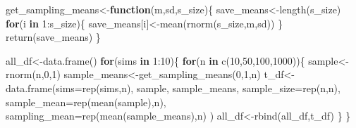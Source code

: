 \documentclass[
  letterpaper,
  DIV=11,
  numbers=noendperiod]{scrreprt}
\newenvironment{Shaded}{\begin{snugshade}}{\end{snugshade}}
\newcommand{\AttributeTok}[1]{\textcolor[rgb]{0.40,0.45,0.13}{#1}}
\newcommand{\ControlFlowTok}[1]{\textcolor[rgb]{0.00,0.23,0.31}{\textbf{#1}}}
\newcommand{\DecValTok}[1]{\textcolor[rgb]{0.68,0.00,0.00}{#1}}
\newcommand{\FunctionTok}[1]{\textcolor[rgb]{0.28,0.35,0.67}{#1}}
\newcommand{\NormalTok}[1]{\textcolor[rgb]{0.00,0.23,0.31}{#1}}
\newcommand{\OtherTok}[1]{\textcolor[rgb]{0.00,0.23,0.31}{#1}}
\newcommand{\SpecialCharTok}[1]{\textcolor[rgb]{0.37,0.37,0.37}{#1}}
\begin{document}
\begin{Shaded}
\begin{Highlighting}[]
\NormalTok{get\_sampling\_means}\OtherTok{\textless{}{-}}\ControlFlowTok{function}\NormalTok{(m,sd,s\_size)\{}
\NormalTok{  save\_means}\OtherTok{\textless{}{-}}\FunctionTok{length}\NormalTok{(s\_size)}
  \ControlFlowTok{for}\NormalTok{(i }\ControlFlowTok{in} \DecValTok{1}\SpecialCharTok{:}\NormalTok{s\_size)\{}
\NormalTok{    save\_means[i]}\OtherTok{\textless{}{-}}\FunctionTok{mean}\NormalTok{(}\FunctionTok{rnorm}\NormalTok{(s\_size,m,sd))}
\NormalTok{  \}}
  \FunctionTok{return}\NormalTok{(save\_means)}
\NormalTok{\}}

\NormalTok{all\_df}\OtherTok{\textless{}{-}}\FunctionTok{data.frame}\NormalTok{()}
\ControlFlowTok{for}\NormalTok{(sims }\ControlFlowTok{in} \DecValTok{1}\SpecialCharTok{:}\DecValTok{10}\NormalTok{)\{}
  \ControlFlowTok{for}\NormalTok{(n }\ControlFlowTok{in} \FunctionTok{c}\NormalTok{(}\DecValTok{10}\NormalTok{,}\DecValTok{50}\NormalTok{,}\DecValTok{100}\NormalTok{,}\DecValTok{1000}\NormalTok{))\{}
\NormalTok{    sample}\OtherTok{\textless{}{-}}\FunctionTok{rnorm}\NormalTok{(n,}\DecValTok{0}\NormalTok{,}\DecValTok{1}\NormalTok{)}
\NormalTok{    sample\_means}\OtherTok{\textless{}{-}}\FunctionTok{get\_sampling\_means}\NormalTok{(}\DecValTok{0}\NormalTok{,}\DecValTok{1}\NormalTok{,n)}
\NormalTok{    t\_df}\OtherTok{\textless{}{-}}\FunctionTok{data.frame}\NormalTok{(}\AttributeTok{sims=}\FunctionTok{rep}\NormalTok{(sims,n),}
\NormalTok{                     sample,}
\NormalTok{                     sample\_means,}
                     \AttributeTok{sample\_size=}\FunctionTok{rep}\NormalTok{(n,n),}
                     \AttributeTok{sample\_mean=}\FunctionTok{rep}\NormalTok{(}\FunctionTok{mean}\NormalTok{(sample),n),}
                     \AttributeTok{sampling\_mean=}\FunctionTok{rep}\NormalTok{(}\FunctionTok{mean}\NormalTok{(sample\_means),n)}
\NormalTok{                     )}
\NormalTok{    all\_df}\OtherTok{\textless{}{-}}\FunctionTok{rbind}\NormalTok{(all\_df,t\_df)}
\NormalTok{  \}}
\NormalTok{\}}



\end{Highlighting}
\end{Shaded}
\end{document}
